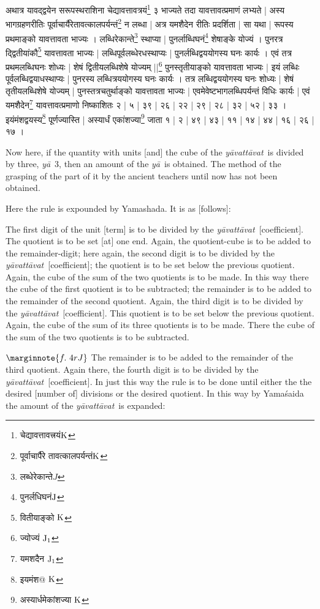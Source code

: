 \documentclass[11pt,a5paper]{book}
\def\yavattavat{\textit{y\=avatt\=avat}}
\def\ya{\textit{y\=a}}
\begin{document}
\newpage 
{\s अथात्र यावद्द्वयेन सरूपस्थराशिना
चेद्यावत्तावत्रयं\footnote{{\s चेद्यावत्तावत्त्रयं}${\rm K}$}
३ भाज्यते
तदा यावत्तावत्प्रमाणं लभ्यते |
अस्य भागग्रहणरीतिः पूर्वाचार्यैरेतावत्कालपर्यन्तं\footnote{{\s पूर्वाचार्पैरे तावत्कालपर्यन्तं}${\rm K}$}
न लब्धा |
अत्र यमशैदेन रीतिः प्रदर्शिता | 
सा यथा | 
रूपस्य प्रथमाङ्को यावत्तावता भाज्यः । लब्धिरेकान्ते\footnote{{\s लब्धेरेकान्ते}$J$}
स्थाप्या | 
पुनर्लाब्धिघनं\footnote{{\s पुनर्लधिघनं}${\rm J}$} शेषाङ्के योज्यं । पुनरत्र
द्द्वितीयांकौ\footnote{{\s  वितीयाङ्को }${\rm K}$}
यावत्तावता भाज्यः |
लब्धिपूर्वलब्धेरधस्थाप्यः | 
पुनर्लब्धिद्वययोगस्य घनः कार्यः । 
एवं तत्र प्रथमलब्धिघनः शोध्यः | 
शेषं द्वितीयलब्धिशेषे योज्यम् ||\footnote{{\s ज्योज्यं }${\rm J_1}$}
पुनस्तृतीयाङ्को यावत्तावता भाज्यः | 
इयं लब्धिः पूर्वलब्धिद्वयाधस्थाप्यः | 
पुनरस्य लब्धित्रययोगस्य घनः कार्यः । 
तत्र लब्धिद्वययोगस्य घनः शोध्यः | 
शेषं तृतीयलब्धिशेषे योज्यम् | 
पुनस्तत्रचतुर्थाङ्को यावत्तावता भाज्यः | 
एवमेवेष्टभागलब्धिपर्यन्तं विधिः कार्यः | 
एवं यमशैदेन\footnote{{\s यमशदैन }${\rm J_1}$}
यावत्तावत्प्रमाणो निष्काशितः २ | ५ | ३९ | २६ | २२ | २९ | २८ | ३२ | ५२ | ३३ ।
इयंमंशद्वयस्य\footnote{{\s इयमंश@ }${\rm K}$}
पूर्णज्यास्ति | 
अस्यार्धं एकांशज्या\footnote{{\s अस्यार्धमेकांशज्या }${\rm K}$} जाता १ | २ | ४९ | ४३ | ११ | १४ | ४४ | १६ | २६ | १७ । }


\newpage 
Now here, if the quantity with units [and] the cube of the \yavattavat\ is divided by three, \ya\ 3, 
then an amount of the \ya\ is obtained.    
The method of the grasping of the part of it 
by the ancient teachers until now has not been obtained.

Here the rule is expounded by Yamashada. It is as [follows]:

The first digit of the unit [term] is to be divided by the \yavattavat\ [coefficient]. The quotient is to be set
[at] one end. Again, the quotient-cube is to be added to the remainder-digit;
here again, the second digit is to be divided by the \yavattavat\ [coefficient]; the quotient is to be set
below the previous quotient. Again, the cube of the sum of the two quotients
is to be made.  In this way there the cube of the first quotient is to be subtracted;
the remainder is to be added to the remainder of the second quotient. Again, the third digit is to be
divided by the \yavattavat\ [coefficient]. This quotient is to be set below the previous quotient. Again,
the cube of the sum of its three quotients is to be made. There the cube of
the sum of the two quotients is to be subtracted. 

$\marginnote{f.~4r J}$
The remainder is to be added to the remainder of the third quotient. Again there, the 
fourth digit is to be divided by the \yavattavat\ [coefficient]. In just this way the rule is to be done until either the the desired [number of] divisions or the desired quotient. In this way by Yama\'saida the amount of the \yavattavat\ is 
expanded:
\end{document}
